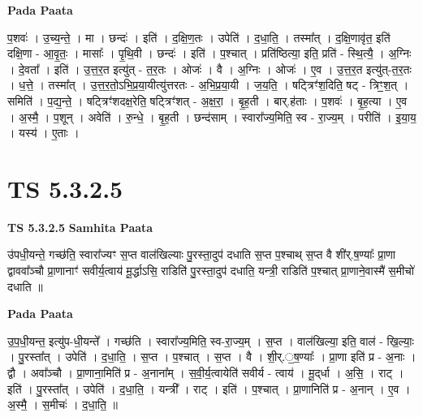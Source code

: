 \documentclass[17pt]{extarticle}
\begin{document}
\textbf{Pada Paata} \newline

प॒शवः॑ । उ॒च्य॒न्ते॒ । मा । छन्दः॑ । इति॑ । द॒क्षि॒ण॒तः । उपेति॑ । द॒धा॒ति॒ । तस्मा᳚त् । द॒क्षि॒णावृ॑त॒ इति॑ दक्षि॒णा - आ॒वृ॒तः॒ । मासाः᳚ । पृ॒थि॒वी । छन्दः॑ । इति॑ । प॒श्चात् । प्रति॑ष्ठित्या॒ इति॒ प्रति॑ - स्थि॒त्यै॒ । अ॒ग्निः । दे॒वता᳚ । इति॑ । उ॒त्त॒र॒त इत्यु॑त् - त॒र॒तः । ओजः॑ । वै । अ॒ग्निः । ओजः॑ । ए॒व । उ॒त्त॒र॒त इत्यु॑त्-त॒र॒तः । ध॒त्ते॒ । तस्मा᳚त् । उ॒त्त॒र॒तो॒ऽभि॒प्र॒या॒यीत्यु॑त्तरतः - अ॒भि॒प्र॒या॒यी । ज॒य॒ति॒ । षट्त्रिꣳ॑श॒दिति॒ षट् - त्रिꣳ॒॒श॒त् । समिति॑ । प॒द्य॒न्ते॒ । षट्त्रिꣳ॑शदक्ष॒रेति॒ षट्त्रिꣳ॑शत् -   अ॒क्ष॒रा॒ । बृ॒ह॒ती । बार्.ह॑ताः । प॒शवः॑ । बृ॒ह॒त्या । ए॒व । अ॒स्मै॒ । प॒शून् । अवेति॑ । रु॒न्धे॒ । बृ॒ह॒ती । छन्द॑साम् । स्वारा᳚ज्य॒मिति॒ स्व - रा॒ज्य॒म् । परीति॑ । इ॒या॒य॒ । यस्य॑ । ए॒ताः ।  \newline




\section*{ TS 5.3.2.5 }

\textbf{TS 5.3.2.5 } \newline
\textbf{Samhita Paata} \newline

उ॑पधी॒यन्ते॒ गच्छ॑ति॒ स्वारा᳚ज्यꣳ स॒प्त वाल॑खिल्याः पु॒रस्ता॒दुप॑ दधाति स॒प्त प॒श्चाथ् स॒प्त वै शी॑र्.ष॒ण्याः᳚ प्रा॒णा द्वाववा᳚ञ्चौ प्रा॒णानाꣳ॑ सवीर्य॒त्वाय॑ मू॒र्द्धाऽसि॒ राडिति॑ पु॒रस्ता॒दुप॑ दधाति॒ यन्त्री॒ राडिति॑ प॒श्चात् प्रा॒णाने॒वास्मै॑ स॒मीचो॑ दधाति ॥ \newline

\textbf{Pada Paata} \newline

उ॒प॒धी॒यन्त॒ इत्यु॑प-धी॒यन्ते᳚ । गच्छ॑ति । स्वारा᳚ज्य॒मिति॒ स्व-रा॒ज्य॒म् । स॒प्त । वाल॑खिल्या॒ इति॒ वाल॑ - खि॒ल्याः॒ । पु॒रस्ता᳚त् । उपेति॑ । द॒धा॒ति॒ । स॒प्त । प॒श्चात् । स॒प्त । वै । शी॒र्.॒ष॒ण्याः᳚ । प्रा॒णा इति॑ प्र - अ॒नाः । द्वौ । अवा᳚ञ्चौ । प्रा॒णाना॒मिति॑ प्र - अ॒नाना᳚म् । स॒वी॒र्य॒त्वायेति॑ सवीर्य - त्वाय॑ । मू॒द्‌र्धा । अ॒सि॒ । राट् । इति॑ । पु॒रस्ता᳚त् । उपेति॑ । द॒धा॒ति॒ । यन्त्री᳚ । राट् । इति॑ । प॒श्चात् । प्रा॒णानिति॑ प्र - अ॒नान् । ए॒व । अ॒स्मै॒ । स॒मीचः॑ । द॒धा॒ति॒ ॥  \newline




\end{document}
